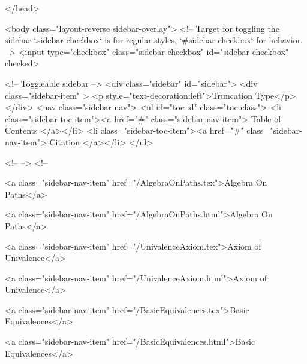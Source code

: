   
</head>




  <body class="layout-reverse sidebar-overlay">
    <!-- Target for toggling the sidebar `.sidebar-checkbox` is for regular
     styles, `#sidebar-checkbox` for behavior. -->
<input type="checkbox" class="sidebar-checkbox" id="sidebar-checkbox" checked>

<!-- Toggleable sidebar -->
<div class="sidebar" id="sidebar">
  <div class="sidebar-item" >
    <p style="text-decoration:left">Truncation Type</p>
  </div>
  <nav class="sidebar-nav">
    <ul id="toc-id" class="toc-class">
  <li class="sidebar-toc-item"><a href="#" class="sidebar-nav-item"> Table of Contents </a></li>
  <li class="sidebar-toc-item"><a href="#" class="sidebar-nav-item"> Citation </a></li>
</ul>


    <!--  -->
    <!-- 
      
    
      
    
      
    
      
    
      
        
      
    
      
        
          <a class="sidebar-nav-item" href="/AlgebraOnPaths.tex">Algebra On Paths</a>
        
      
    
      
        
          <a class="sidebar-nav-item" href="/AlgebraOnPaths.html">Algebra On Paths</a>
        
      
    
      
        
          <a class="sidebar-nav-item" href="/UnivalenceAxiom.tex">Axiom of Univalence</a>
        
      
    
      
        
          <a class="sidebar-nav-item" href="/UnivalenceAxiom.html">Axiom of Univalence</a>
        
      
    
      
        
          <a class="sidebar-nav-item" href="/BasicEquivalences.tex">Basic Equivalences</a>
        
      
    
      
        
          <a class="sidebar-nav-item" href="/BasicEquivalences.html">Basic Equivalences</a>
        
